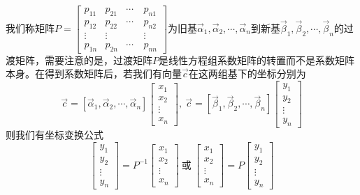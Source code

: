\documentclass[12pt,a4paper,UTF8]{book}
\begin{document}
\begin{enumerate}
我们称矩阵$P=\begin{bmatrix}p_{11}&p_{21}&\cdots&p_{n1}\\p_{12}&p_{22}&\cdots&p_{n2}\\\vdots&\vdots&\quad&\vdots\\p_{1n}&p_{2n}&\cdots&p_{nn}\end{bmatrix}$为旧基$\vec{\alpha}_1,\vec{\alpha}_2,\cdots,\vec{\alpha}_n$到新基$\vec{\beta}_1,\vec{\beta}_2,\cdots,\vec{\beta}_n$的过渡矩阵，需要注意的是，过渡矩阵$P$是线性方程组系数矩阵的转置而不是系数矩阵本身。在得到系数矩阵后，若我们有向量$\vec{c}$在这两组基下的坐标分别为
\[\vec{c}=\left[\vec{\alpha}_1,\vec{\alpha}_2,\cdots,\vec{\alpha}_n\right]\begin{bmatrix}x_1\\x_2\\\vdots\\x_n\end{bmatrix},\ \vec{c}=\left[\vec{\beta}_1,\vec{\beta}_2,\cdots,\vec{\beta}_n\right]\begin{bmatrix}y_1\\y_2\\\vdots\\y_n\end{bmatrix}\]
则我们有坐标变换公式
\[\begin{bmatrix}y_1\\y_2\\\vdots\\y_n\end{bmatrix}=P^{-1}\begin{bmatrix}x_1\\x_2\\\vdots\\x_n\end{bmatrix}\ \text{或}\ \begin{bmatrix}x_1\\x_2\\\vdots\\x_n\end{bmatrix}=P\begin{bmatrix}y_1\\y_2\\\vdots\\y_n\end{bmatrix}\]
\end{enumerate}
\end{document}
